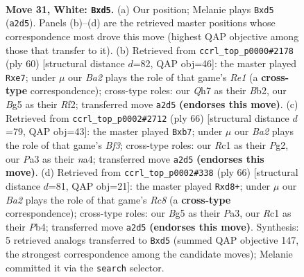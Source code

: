 \documentclass[11pt]{article}
\begin{document}
\clearpage

\begin{figure}[p]\centering
\begin{subfigure}{0.46\textwidth}\centering
\resizebox{\linewidth}{!}{%
\newchessgame
\chessboard[
  setfen={rn3k2/pp3qpQ/5P2/2Pr2B1/8/P5P1/BP3P2/2R1R1K1 w - - 1 31},
  showmover=false,
  pgfstyle=straightmove, color=movearrow, markmove={a2-d5}
]}
\caption{}
\end{subfigure}\hfill
\begin{subfigure}{0.46\textwidth}\centering
\resizebox{\linewidth}{!}{%
\newchessgame
\chessboard[
  setfen={5rk1/pp2q1p1/8/7p/3n4/P2r1P1P/1B3RP1/4R1K1 w - - 0 31},
  showmover=false,
  pgfstyle=straightmove, color=movearrow, markmove={e1-e7}
]}
\caption{}
\end{subfigure}
\\[4pt]
\begin{subfigure}{0.46\textwidth}\centering
\resizebox{\linewidth}{!}{%
\newchessgame
\chessboard[
  setfen={2rq3k/pr5p/5p1Q/5P2/n1Pp4/5B1P/P5P1/3R2K1 w - - 0 34},
  showmover=false,
  pgfstyle=straightmove, color=movearrow, markmove={f3-b7}
]}
\caption{}
\end{subfigure}\hfill
\begin{subfigure}{0.46\textwidth}\centering
\resizebox{\linewidth}{!}{%
\newchessgame
\chessboard[
  setfen={2Rr2k1/p4p2/3qp1p1/7p/1P1r4/P6P/4QPP1/2R3K1 w - - 3 34},
  showmover=false,
  pgfstyle=straightmove, color=movearrow, markmove={c8-d8}
]}
\caption{}
\end{subfigure}
\caption{\textbf{Move 31, White: \texttt{Bxd5}.} (a) Our position; Melanie plays \texttt{Bxd5} (\texttt{a2d5}). Panels (b)--(d) are the retrieved master positions whose correspondence most drove this move (highest QAP objective among those that transfer to it). (b) Retrieved from \texttt{ccrl\_top\_p0000\#2178} (ply 60) [structural distance $d$=82, QAP obj=46]: the master played \texttt{Rxe7}; under $\mu$ our \emph{Ba2} plays the role of that game's \emph{Re1} (a \textbf{cross-type} correspondence); cross-type roles: our \emph{Q}h7 as their \emph{B}b2, our \emph{B}g5 as their \emph{R}f2; transferred move \texttt{a2d5} \textbf{(endorses this move)}. (c) Retrieved from \texttt{ccrl\_top\_p0002\#2712} (ply 66) [structural distance $d$=79, QAP obj=43]: the master played \texttt{Bxb7}; under $\mu$ our \emph{Ba2} plays the role of that game's \emph{Bf3}; cross-type roles: our \emph{R}c1 as their \emph{P}g2, our \emph{P}a3 as their \emph{n}a4; transferred move \texttt{a2d5} \textbf{(endorses this move)}. (d) Retrieved from \texttt{ccrl\_top\_p0002\#338} (ply 66) [structural distance $d$=81, QAP obj=21]: the master played \texttt{Rxd8+}; under $\mu$ our \emph{Ba2} plays the role of that game's \emph{Rc8} (a \textbf{cross-type} correspondence); cross-type roles: our \emph{B}g5 as their \emph{P}a3, our \emph{R}c1 as their \emph{P}b4; transferred move \texttt{a2d5} \textbf{(endorses this move)}. Synthesis: 5 retrieved analogs transferred to \texttt{Bxd5} (summed QAP objective 147, the strongest correspondence among the candidate moves); Melanie committed it via the \texttt{search} selector.}
\label{fig:thought-m60}
\end{figure}
\end{document}
